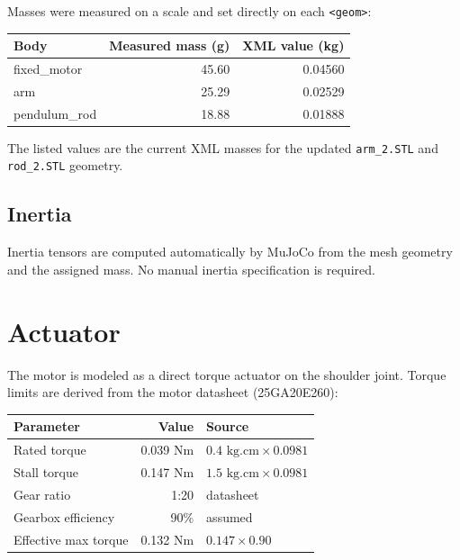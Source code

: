 \documentclass[12pt,a4paper]{article}
\begin{document}
Masses were measured on a scale and set directly on each \texttt{<geom>}:

\begin{center}
\begin{tabular}{lrr}
\toprule
\textbf{Body} & \textbf{Measured mass (g)} & \textbf{XML value (kg)} \\
\midrule
fixed\_motor  & 45.60 & 0.04560 \\
arm           & 25.29 & 0.02529 \\
pendulum\_rod & 18.88 & 0.01888 \\
\bottomrule
\end{tabular}
\end{center}

\noindent The listed values are the current XML masses for the updated
\texttt{arm\_2.STL} and \texttt{rod\_2.STL} geometry.

\subsection{Inertia}

Inertia tensors are computed automatically by MuJoCo from the mesh geometry and the assigned mass.
No manual inertia specification is required.

\section{Actuator}

The motor is modeled as a direct torque actuator on the shoulder joint.
Torque limits are derived from the motor datasheet (25GA20E260):

\begin{center}
\begin{tabular}{lrl}
\toprule
\textbf{Parameter} & \textbf{Value} & \textbf{Source} \\
\midrule
Rated torque  & 0.039 Nm & $0.4 \text{ kg.cm} \times 0.0981$ \\
Stall torque  & 0.147 Nm & $1.5 \text{ kg.cm} \times 0.0981$ \\
Gear ratio    & 1:20     & datasheet \\
Gearbox efficiency & 90\% & assumed \\
Effective max torque & 0.132 Nm & $0.147 \times 0.90$ \\
\bottomrule
\end{tabular}
\end{center}
\end{document}
